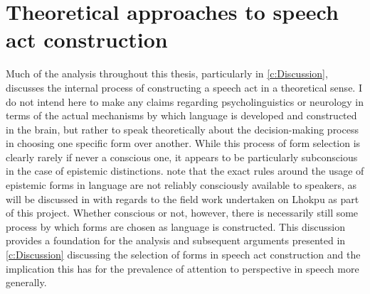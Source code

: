 \section{Theoretical approaches to speech act construction}\label{ss:Discussion:SpeechActs}
Much of the analysis throughout this thesis, particularly in \cref{c:Discussion}, discusses the internal process of constructing a speech act in a theoretical sense. I do not intend here to make any claims regarding psycholinguistics or neurology in terms of the actual mechanisms by which language is developed and constructed in the brain, but rather to speak theoretically about the decision-making process in choosing one specific form over another. While this process of form selection is clearly rarely if never a conscious one, it appears to be particularly subconscious in the case of epistemic distinctions.  note that the exact rules around the usage of epistemic forms in language are not reliably consciously available to speakers, as will be discussed in  with regards to the field work undertaken on Lhokpu as part of this project. Whether conscious or not, however, there is necessarily still some process by which forms are chosen as language is constructed. This discussion provides a foundation for the analysis and subsequent arguments presented in \cref{c:Discussion} discussing the selection of forms in speech act construction and the implication this has for the prevalence of attention to perspective in speech more generally.

